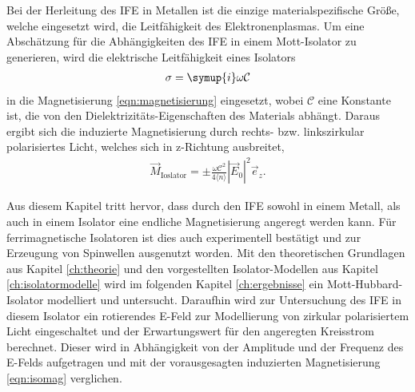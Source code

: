 Bei der Herleitung des IFE in Metallen ist die einzige materialspezifische Größe, welche eingesetzt wird,
die Leitfähigkeit des Elektronenplasmas. Um eine Abschätzung für die Abhängigkeiten des IFE in einem Mott-Isolator zu generieren,
wird die elektrische Leitfähigkeit eines Isolators\cite{fließbach}
\begin{align}
  \sigma = \symup{i} \omega \mathcal{C}
\end{align}
in die Magnetisierung \eqref{eqn:magnetisierung} eingesetzt, wobei $\mathcal{C}$ eine Konstante ist, die von den Dielektrizitäts-Eigenschaften des Materials abhängt.
Daraus ergibt sich die induzierte Magnetisierung durch rechts- bzw. linkszirkular polarisiertes Licht, welches sich in z-Richtung ausbreitet,
\begin{align}
  \vec{M}_\text{Ioslator} = \pm \frac{\omega \mathcal{C}^2}{4 \langle n \rangle} \left| \vec{E}_0 \right|^2 \vec{e}_z.
  \label{eqn:isomag}
\end{align}

Aus diesem Kapitel tritt hervor, dass durch den IFE sowohl in einem Metall, als auch in einem Isolator eine endliche Magnetisierung angeregt werden kann.
Für ferrimagnetische Isolatoren ist dies auch experimentell bestätigt und zur Erzeugung von Spinwellen ausgenutzt worden\cite{jäckl}.
Mit den theoretischen Grundlagen aus Kapitel \ref{ch:theorie} und den vorgestellten Isolator-Modellen aus Kapitel \ref{ch:isolatormodelle}
wird im folgenden Kapitel \ref{ch:ergebnisse} ein Mott-Hubbard-Isolator modelliert und untersucht.
Daraufhin wird zur Untersuchung des IFE in diesem Isolator ein rotierendes E-Feld zur Modellierung von zirkular polarisiertem Licht eingeschaltet und
der Erwartungswert für den angeregten Kreisstrom berechnet. Dieser wird in Abhängigkeit von der Amplitude und der Frequenz des E-Felds aufgetragen
und mit der vorausgesagten induzierten Magnetisierung \eqref{eqn:isomag} verglichen. \cite{hertel}
